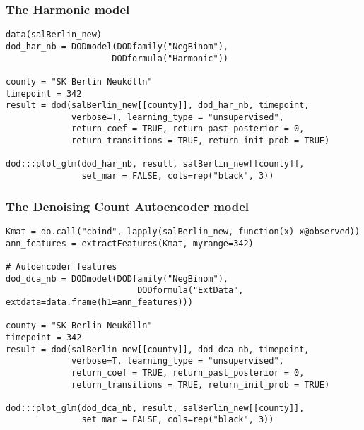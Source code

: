 \documentclass[a4paper]{article}\usepackage[]{graphicx}\usepackage[]{color}
\makeatletter
\newenvironment{kframe}{%
 \def\at@end@of@kframe{}%
 \ifinner\ifhmode%
  \def\at@end@of@kframe{\end{minipage}}%
  \begin{minipage}{\columnwidth}%
 \fi\fi%
 \def\FrameCommand##1{\hskip\@totalleftmargin \hskip-\fboxsep
 \colorbox{shadecolor}{##1}\hskip-\fboxsep
     \hskip-\linewidth \hskip-\@totalleftmargin \hskip\columnwidth}%
 \MakeFramed {\advance\hsize-\width
   \@totalleftmargin\z@ \linewidth\hsize
   \@setminipage}}%
 {\par\unskip\endMakeFramed%
 \at@end@of@kframe}
\newenvironment{knitrout}{}{} %
\makeatother
\begin{document}
\subsubsection{The Harmonic model}

\begin{knitrout}
\color{fgcolor}\begin{kframe}
\begin{verbatim}
data(salBerlin_new)
dod_har_nb = DODmodel(DODfamily("NegBinom"),
                     DODformula("Harmonic"))

county = "SK Berlin Neukölln"
timepoint = 342
result = dod(salBerlin_new[[county]], dod_har_nb, timepoint, 
             verbose=T, learning_type = "unsupervised",
             return_coef = TRUE, return_past_posterior = 0,
             return_transitions = TRUE, return_init_prob = TRUE)

dod:::plot_glm(dod_har_nb, result, salBerlin_new[[county]], 
               set_mar = FALSE, cols=rep("black", 3))
\end{verbatim}
\end{kframe}
\end{knitrout}


\subsubsection{The Denoising Count Autoencoder model}

\begin{knitrout}
\color{fgcolor}\begin{kframe}
\begin{verbatim}
Kmat = do.call("cbind", lapply(salBerlin_new, function(x) x@observed))
ann_features = extractFeatures(Kmat, myrange=342)

# Autoencoder features
dod_dca_nb = DODmodel(DODfamily("NegBinom"),
                          DODformula("ExtData", extdata=data.frame(h1=ann_features)))

county = "SK Berlin Neukölln"
timepoint = 342
result = dod(salBerlin_new[[county]], dod_dca_nb, timepoint, 
             verbose=T, learning_type = "unsupervised",
             return_coef = TRUE, return_past_posterior = 0,
             return_transitions = TRUE, return_init_prob = TRUE)

dod:::plot_glm(dod_dca_nb, result, salBerlin_new[[county]], 
               set_mar = FALSE, cols=rep("black", 3))
\end{verbatim}
\end{kframe}
\end{knitrout}
\end{document}
